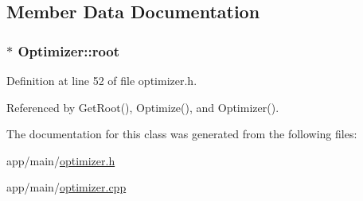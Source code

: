 \subsection{Member Data Documentation}
\subsubsection[{\texorpdfstring{root}{root}}]{$\ast$ Optimizer\+::root\hspace{0.3cm}{\ttfamily [private]}}\hypertarget{classOptimizer_a665ceeca2e548de6fc68827fb910bd98}{}\label{classOptimizer_a665ceeca2e548de6fc68827fb910bd98}


Definition at line 52 of file optimizer.\+h.



Referenced by Get\+Root(), Optimize(), and Optimizer().



The documentation for this class was generated from the following files\+:\begin{DoxyCompactItemize}
\item 
app/main/\hyperlink{optimizer_8h}{optimizer.\+h}\item 
app/main/\hyperlink{optimizer_8cpp}{optimizer.\+cpp}\end{DoxyCompactItemize}

